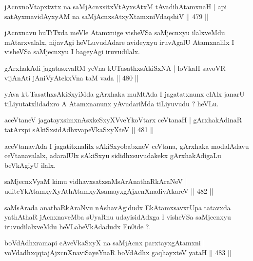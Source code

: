 \begin{shl}
jAcnxnoVtapxtwtx na saMjAcnx\s sitxVtAyxsAtxM tAvadihA\s \s tamxnaH |
api satAyxmavidAyxyAM na saMjAcnx\s sAtxyXtamxniVdaqshiV \hfill  || 479 ||
\end{shl}

\begin{artha}
jAcnxnavu huTiTxda meVle Atamxnige visheVSa saMjecnxyu ilalxveMdu mAtarxvalalx, nijavAgi heVLuvudAdare avideyxyu iruvAgalU Atamxnalilx I visheVSa saMjecnxyu I bageyAgi iruvudilalx.
\end{artha}

\begin{shl}
gArxhakAdi jagatasxvaRM yeVna kUTasathxsAkiSxNA |
loVkaH savoVR vijAnAti jAniVyAtekxVna taM vada \hfill  || 480 ||
\end{shl}

\begin{artha}
yAva kUTasathxsAkiSxyiMda gArxhaka muMtAda I jagatatxnunx elAlx janarU
tiLiyutatxlidadxro A Atamxnanunx yAvudariMda tiLiyuvudu ? heVLu.
\end{artha}


\begin{shl}
aceVtaneV jagatayxsimxnAsxkeSxyXVveYkoV\s tarx ceVtanaH |
gArxhakAdinaR tatArxpi sAkiSxsidAdhxvapeVkaSxyXteV \hfill  || 481 ||
\end{shl}

\begin{artha}
aceVtanavAda I jagatitxnalilx sAkiSxyobabxneV ceVtana,  gArxhaka modalAdavu ceVtanavalalx, adaralUlx sAkiSxyu sididhxsuvudakekx gArxhakAdigaLu beVkAgiyU ilalx.
\end{artha}

\begin{shl}
saMjecnxVyaM kimu vidhavxsatxsaMsArAnathaRkAraNeV |
uditeYkAtamxyXyAthAtamxyXsamayxgAjxcnXnadivAkareV \hfill  || 482 ||
\end{shl}

\begin{artha}
saMsArada anathaRkAraNvu nAshavAgidudx EkAtamxsavxrUpa tatavxda yathAthaR jAcnxnaveMba sUyaRnu udayisidAdxga I visheVSa saMjecnxyu iruvudilalxveMdu heVLabeVkAdadudx En0ide ?.
\end{artha}


\begin{shl}
boVdAdhxramapi cAveVkaSxyX na saMjAcnx parxtayxgAtamxni |
voVdadhxqqtajAjxcnXnaviSayeYnaR boVdAdhx gaqhayxteV yataH \hfill  || 483 ||
\end{shl}

